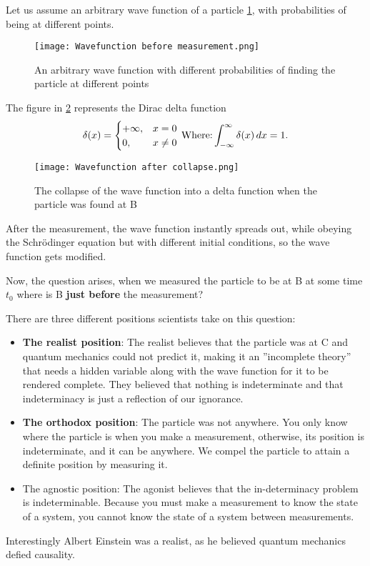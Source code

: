 \documentclass{article}
\begin{document}
Let us assume an arbitrary wave function of a particle \ref{fig:Before measurement}, with probabilities of being at different points.



\begin{figure}
\centering
     \texttt{[image: Wavefunction before measurement.png]}
      \caption{An arbitrary wave function with different probabilities of finding the particle at different points}
       \label{fig:Before measurement}
\end{figure}



The figure in \ref{fig:collapse} represents the Dirac delta function
\begin{equation}
    \delta (x)={\begin{cases}+\infty ,&x=0\\0,&x\neq 0\end{cases}}
    \label{eq:4}\\
    \ \text{Where:} \int _{-\infty }^{\infty }\delta (x)\,dx=1.
\end{equation}

\begin{figure}
\centering
     \texttt{[image: Wavefunction after collapse.png]}
      \caption{The collapse of the wave function into a delta function when the particle was found at B }
       \label{fig:collapse}
\end{figure}




After the measurement, the wave function instantly spreads out, while obeying the Schr\"{o}dinger equation but with different initial conditions, so the wave function gets modified.

Now, the question arises, when we measured the particle to be at B at some time $t_0$ where is B \textbf{just before} the measurement?

There are three different positions scientists take on this question:
\begin{itemize}
\item \textbf{The realist position}: The realist believes that the particle was at C and quantum mechanics could not predict it, making it an ”incomplete theory” that needs a hidden variable along with the wave function for it to be rendered complete. They believed that nothing is indeterminate and that indeterminacy is just a reflection of our ignorance. 
\item \textbf{The orthodox position}: The particle was not anywhere. You only know where the particle is when you make a measurement, otherwise, its position is indeterminate, and it can be anywhere. We compel the particle to attain a definite position by measuring it. 
\item The agnostic position: The agonist believes that the in-determinacy problem is indeterminable. Because you must make a measurement to know the state of a system, you cannot know the state of a system between measurements. 
\end{itemize}
Interestingly Albert Einstein was a realist, as he believed quantum mechanics defied causality.
\end{document}
